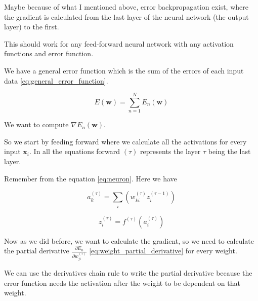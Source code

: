 \documentclass[a4paper,12pt]{article}
\theoremstyle{mytheoremstyle}
\theoremstyle{mytheoremstyle}
\theoremstyle{myproblemstyle}
\begin{document}
    Maybe because of what I mentioned above, error backpropagation exist, where
    the gradient is calculated from the last layer of the neural network (the
    output layer) to the first.

    This should work for any feed-forward neural network with any activation
    functions and error function.

    We have a general error function which is the sum of the errors of each
    input data \eqref{eq:general_error_function}.

    \begin{equation}
        E \left( \mathbf{w} \right) = \displaystyle\sum_{n=1}^{N} E_{n}(\mathbf{w})
        \label{eq:general_error_function}
    \end{equation}

    We want to compute $ \nabla E_{n} \left( \mathbf{w} \right) $.

    So we start by feeding forward where we calculate all the activations for
    every input $ \mathbf{x}_{i} $. In all the equations forward $ \left( \tau
    \right) $ represents the layer $ \tau $ being the last layer.

    Remember from the equation \eqref{eq:neuron}. Here we have

    \newcommand{\nlayer}{\left( \tau \right)}
    \newcommand{\nplayer}[1]{\left( \tau - {#1} \right)}
    \newcommand{\npblayer}[1]{\left( \tau + {#1} \right)}
    \begin{equation}
        a_{k}^{\nlayer} = \displaystyle\sum_{i} \left( w_{ki}^{\nlayer} z_{i}^{\nplayer{1}} \right)
    \end{equation}

    \begin{equation}
        z_{i}^{\left( \tau \right)} = f^{\left( \tau \right)} \left( a_{i}^{\left( \tau \right)} \right)
    \end{equation}

    \newcommand{\pd}[2]{\frac{\partial {#1}}{\partial {#2}}}
    \newcommand{\ajl}{a_{j^{\nlayer}}^{\nlayer}}
    \newcommand{\ajpl}[1]{a_{j^{\npblayer{#1}}}^{\npblayer{#1}}}
    Now as we did before, we want to calculate the gradient, so we need to
    calculate the partial derivative $ \pd{E_{n}}{w_{ji}^{\nlayer}} $
    \eqref{eq:weight_partial_derivative} for every weight.

    We can use the derivatives chain rule to write the partial derivative
    because the error function needs the activation after the weight to be
    dependent on that weight.
\end{document}

